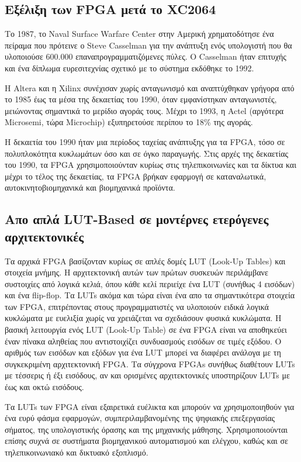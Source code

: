\subsection{Εξέλιξη των FPGA μετά το XC2064}
Το 1987, το Naval Surface Warfare Center στην Αμερική χρηματοδότησε ένα πείραμα που πρότεινε ο Steve Casselman για την ανάπτυξη ενός υπολογιστή που
θα υλοποιούσε 600.000 επαναπρογραμματιζόμενες πύλες. Ο Casselman ήταν επιτυχής και ένα δίπλωμα ευρεσιτεχνίας σχετικό με το σύστημα εκδόθηκε το 1992.

Η Altera και η Xilinx συνέχισαν χωρίς ανταγωνισμό και αναπτύχθηκαν γρήγορα από το 1985 έως τα μέσα της δεκαετίας του 1990, όταν εμφανίστηκαν ανταγωνιστές,
μειώνοντας σημαντικά το μερίδιο αγοράς τους. Μέχρι το 1993, η Actel (αργότερα Microsemi, τώρα Microchip) εξυπηρετούσε περίπου το 18\% της αγοράς.

Η δεκαετία του 1990 ήταν μια περίοδος ταχείας ανάπτυξης για τα FPGA, τόσο σε πολυπλοκότητα κυκλωμάτων όσο και σε όγκο παραγωγής.
Στις αρχές της δεκαετίας του 1990, τα FPGA χρησιμοποιούνταν κυρίως στις τηλεπικοινωνίες και τα δίκτυα
και μέχρι το τέλος της δεκαετίας, τα FPGA βρήκαν εφαρμογή σε καταναλωτικά, αυτοκινητοβιομηχανικά και βιομηχανικά προϊόντα.

\subsection{Απο απλά LUT-Based σε μοντέρνες ετερόγενες αρχιτεκτονικές}
Τα αρχικά FPGA βασίζονταν κυρίως σε απλές δομές LUT (Look-Up Tables) και στοιχεία μνήμης.
Η αρχιτεκτονική αυτών των πρώτων συσκευών περιλάμβανε συστοιχίες από λογικά κελιά, όπου κάθε κελί περιείχε ένα LUT (συνήθως 4 εισόδων) και ένα flip-flop.
Τα LUTs ακόμα και τώρα είναι ένα απο τα σημαντικότερα στοιχεία των FPGA, επιτρέποντας στους προγραμματιστές να υλοποιούν ειδικά λογικά κυκλώματα με ευελιξία χωρίς να χρειάζεται να σχεδιάσουν φυσικά κυκλώματα.
Η βασική λειτουργία ενός LUT (Look-Up Table) σε ένα FPGA είναι να αποθηκεύει έναν πίνακα αληθείας που αντιστοιχίζει συνδυασμούς εισόδων σε τιμές εξόδου.
Ο αριθμός των εισόδων και εξόδων για ένα LUT μπορεί να διαφέρει ανάλογα με τη συγκεκριμένη αρχιτεκτονική FPGA.
Τα σύγχρονα FPGAs συνήθως διαθέτουν LUTs με τέσσερις ή έξι εισόδους, αν και ορισμένες αρχιτεκτονικές υποστηρίζουν LUTs με έως και οκτώ εισόδους.


Τα LUTs των FPGA είναι εξαιρετικά ευέλικτα και μπορούν να χρησιμοποιηθούν για ένα ευρύ φάσμα εφαρμογών, συμπεριλαμβανομένης της ψηφιακής επεξεργασίας σήματος, της υπολογιστικής όρασης και της μηχανικής μάθησης. Χρησιμοποιούνται επίσης συχνά σε συστήματα βιομηχανικού αυτοματισμού και ελέγχου, καθώς και σε τηλεπικοινωνιακό και δικτυακό εξοπλισμό.

